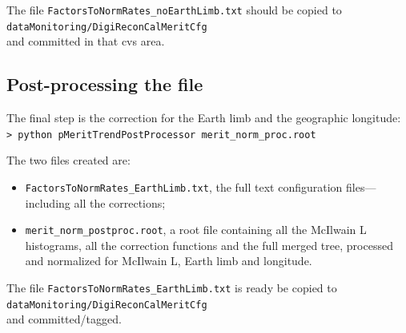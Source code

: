 \documentclass[a4paper,twocolumn]{article}
\begin{document}
The file \texttt{FactorsToNormRates\_noEarthLimb.txt} should be copied
to\\
\texttt{dataMonitoring/DigiReconCalMeritCfg}\\
and committed in that cvs area.

\subsection{Post-processing the file}

The final step is the correction for the Earth limb and the geographic
longitude:\\
\texttt{> python pMeritTrendPostProcessor merit\_norm\_proc.root}

The two files created are:
\begin{itemize}
  \item \texttt{FactorsToNormRates\_EarthLimb.txt}, the full text configuration
    files---including all the corrections;
  \item \texttt{merit\_norm\_postproc.root}, a root file containing all the
    McIlwain L histograms, all the correction functions and the full merged
    tree, processed and normalized for McIlwain L, Earth limb and longitude.
\end{itemize}

The file \texttt{FactorsToNormRates\_EarthLimb.txt} is ready be copied
to\\
\texttt{dataMonitoring/DigiReconCalMeritCfg}\\
and committed/tagged.
\end{document}

